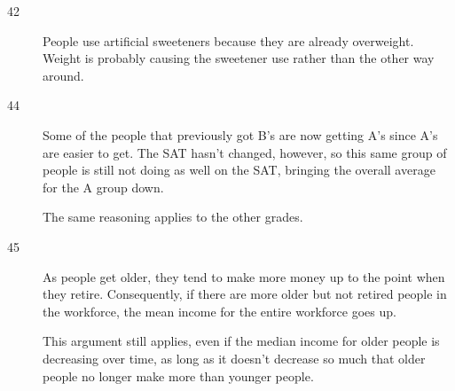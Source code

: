 \documentclass[letterpaper, landscape]{exam}
\begin{document}
\begin{description}

      \item[42]
        People use artificial sweeteners because they are already overweight.
        Weight is probably causing the sweetener use rather than the other way
        around.

      \item[44]
        Some of the people that previously got B's are now getting A's since A's
        are easier to get.  The SAT hasn't changed, however, so this same group
        of people is still not doing as well on the SAT, bringing the overall
        average for the A group down.

        The same reasoning applies to the other grades.

      \item[45]
        As people get older, they tend to make more money up to the point when
        they retire.  Consequently, if there are more older but not retired
        people in the workforce, the mean income for the entire workforce goes
        up.

        This argument still applies, even if the median income for older people
        is decreasing over time, as long as it doesn't decrease so much that
        older people no longer make more than younger people.


\end{description}
\end{document}
